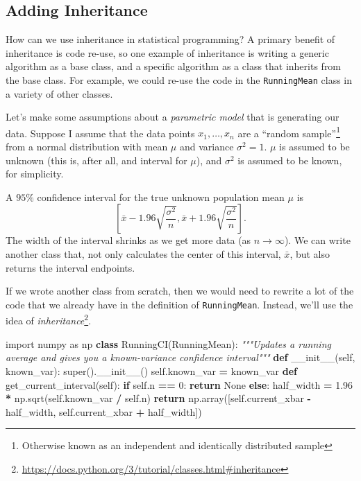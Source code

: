 \documentclass[
  12pt,
  krantz2]{krantz}
\makeatletter
\newenvironment{Shaded}{\begin{snugshade}}{\end{snugshade}}
\newcommand{\BuiltInTok}[1]{#1}
\newcommand{\CommentTok}[1]{\textcolor[rgb]{0.37,0.37,0.37}{\textit{#1}}}
\newcommand{\ControlFlowTok}[1]{\textcolor[rgb]{0.27,0.27,0.27}{\textbf{#1}}}
\newcommand{\DecValTok}[1]{\textcolor[rgb]{0.06,0.06,0.06}{#1}}
\newcommand{\FloatTok}[1]{\textcolor[rgb]{0.06,0.06,0.06}{#1}}
\newcommand{\FunctionTok}[1]{\textcolor[rgb]{0,0,0}{#1}}
\newcommand{\ImportTok}[1]{#1}
\newcommand{\KeywordTok}[1]{\textcolor[rgb]{0.27,0.27,0.27}{\textbf{#1}}}
\newcommand{\NormalTok}[1]{#1}
\newcommand{\OperatorTok}[1]{\textcolor[rgb]{0.43,0.43,0.43}{\textbf{#1}}}
\newcommand{\VariableTok}[1]{\textcolor[rgb]{0,0,0}{#1}}
\renewcommand{\href}[2]{#2\footnote{\url{#1}}}
\newenvironment{kframe}{%
\medskip{}
\setlength{\fboxsep}{.8em}
 \def\at@end@of@kframe{}%
 \ifinner\ifhmode%
  \def\at@end@of@kframe{\end{minipage}}%
  \begin{minipage}{\columnwidth}%
 \fi\fi%
 \def\FrameCommand##1{\hskip\@totalleftmargin \hskip-\fboxsep
 \colorbox{shadecolor}{##1}\hskip-\fboxsep
     \hskip-\linewidth \hskip-\@totalleftmargin \hskip\columnwidth}%
 \MakeFramed {\advance\hsize-\width
   \@totalleftmargin\z@ \linewidth\hsize
   \@setminipage}}%
 {\par\unskip\endMakeFramed%
 \at@end@of@kframe}
\renewenvironment{Shaded}{\begin{kframe}}{\end{kframe}}
\makeatother
\begin{document}
\hypertarget{adding-inheritance}{%
\subsection{Adding Inheritance}\label{adding-inheritance}}

How can we use inheritance in statistical programming? A primary benefit of inheritance is code re-use, so one example of inheritance is writing a generic algorithm as a base class, and a specific algorithm as a class that inherits from the base class. For example, we could re-use the code in the \texttt{RunningMean} class in a variety of other classes.

Let's make some assumptions about a \emph{parametric model} that is generating our data. Suppose I assume that the data points \(x_1, \ldots, x_n\) are a ``random sample''\footnote{Otherwise known as an independent and identically distributed sample} from a normal distribution with mean \(\mu\) and variance \(\sigma^2=1\). \(\mu\) is assumed to be unknown (this is, after all, and interval for \(\mu\)), and \(\sigma^2\) is assumed to be known, for simplicity.

A \(95\%\) confidence interval for the true unknown population mean \(\mu\) is
\[
\left[\bar{x} - 1.96 \sqrt{\frac{\sigma^2}{n}}, \bar{x} + 1.96 \sqrt{\frac{\sigma^2}{n}} \right].
\]
The width of the interval shrinks as we get more data (as \(n \to \infty\)). We can write another class that, not only calculates the center of this interval, \(\bar{x}\), but also returns the interval endpoints.

If we wrote another class from scratch, then we would need to rewrite a lot of the code that we already have in the definition of \texttt{RunningMean}. Instead, we'll use the idea of \href{https://docs.python.org/3/tutorial/classes.html\#inheritance}{\emph{inheritance}}.

\begin{Shaded}
\begin{Highlighting}[]
\ImportTok{import}\NormalTok{ numpy }\ImportTok{as}\NormalTok{ np}
\KeywordTok{class}\NormalTok{ RunningCI(RunningMean):}
  \CommentTok{"""Updates a running average and gives you a known{-}variance confidence interval"""}
  \KeywordTok{def} \FunctionTok{\_\_init\_\_}\NormalTok{(}\VariableTok{self}\NormalTok{, known\_var):}
    \BuiltInTok{super}\NormalTok{().}\FunctionTok{\_\_init\_\_}\NormalTok{()}
    \VariableTok{self}\NormalTok{.known\_var }\OperatorTok{=}\NormalTok{ known\_var}
  \KeywordTok{def}\NormalTok{ get\_current\_interval(}\VariableTok{self}\NormalTok{):}
    \ControlFlowTok{if} \VariableTok{self}\NormalTok{.n }\OperatorTok{==} \DecValTok{0}\NormalTok{:}
      \ControlFlowTok{return} \VariableTok{None}
    \ControlFlowTok{else}\NormalTok{:}
\NormalTok{      half\_width }\OperatorTok{=} \FloatTok{1.96} \OperatorTok{*}\NormalTok{ np.sqrt(}\VariableTok{self}\NormalTok{.known\_var }\OperatorTok{/} \VariableTok{self}\NormalTok{.n)  }
      \ControlFlowTok{return}\NormalTok{ np.array([}\VariableTok{self}\NormalTok{.current\_xbar }\OperatorTok{{-}}\NormalTok{ half\_width, }\VariableTok{self}\NormalTok{.current\_xbar }\OperatorTok{+}\NormalTok{ half\_width])}
\end{Highlighting}
\end{Shaded}
\end{document}
